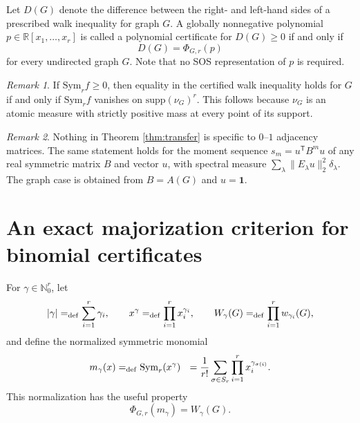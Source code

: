 \documentclass[11pt]{article}
\newcommand{\Nat}{\mathbb{N}}
\newcommand{\supp}{\mathrm{supp}}
\newcommand{\Sym}{\mathrm{Sym}}
\newcommand{\one}{\mathbf{1}}
\theoremstyle{remark}
\newtheorem{remark}{Remark}
\begin{document}
Let $D(G)$ denote the difference between the right- and
left-hand sides of a prescribed walk inequality for graph $G$. A globally
nonnegative polynomial $p\in\mathbb R[x_1,\ldots,x_r]$ is called
a polynomial certificate for $D(G)\geq0$ if and only if 
\[
  D(G)=\Phi_{G,r}(p)
\]
for every undirected graph $G$. 
Note that no SOS representation of $p$ is required.

\begin{remark}\label{rem:equality-transfer}
If $\Sym_r f\geq 0$, then equality in the certified walk inequality holds
for $G$ if and only if $\Sym_r f$ vanishes on
$\supp(\nu_G)^r$.  This follows because $\nu_G$ is an atomic measure with
strictly positive mass at every point of its support.
\end{remark}

\begin{remark}
Nothing in Theorem \ref{thm:transfer} is specific to $0$--$1$ adjacency matrices. The same statement holds for the moment sequence $s_m=u^{\mathsf T}B^mu$ of any real symmetric matrix $B$ and vector $u$, with spectral measure $\sum_\lambda\lVert E_\lambda u\rVert_2^2\delta_\lambda$. The graph case is obtained from $B=A(G)$ and $u=\one$.
\end{remark}


\section{An exact majorization criterion for binomial certificates}

For $\gamma\in\Nat_0^r$, let
\[|\gamma|=_{\rm def} \sum_{i=1}^r \gamma_i, 
   \qquad
  x^\gamma=_{\rm def}\prod_{i=1}^r x_i^{\gamma_i},
  \qquad
  W_\gamma(G)=_{\rm def}\prod_{i=1}^r w_{\gamma_i}(G),
\]
and define the normalized symmetric monomial
\begin{equation*}\label{eq:monomial-mean}
  m_\gamma(x)=_{\rm def} \Sym_r(x^\gamma)
  ~~=\frac{1}{r!}\sum_{\sigma\in S_r}
      \prod_{i=1}^r x_i^{\gamma_{\sigma(i)}}.
\end{equation*}
This normalization has the useful property
\begin{equation}\label{eq:Phi-monomial}
  \Phi_{G,r}(m_\gamma)=W_\gamma(G).
\end{equation}
\end{document}
